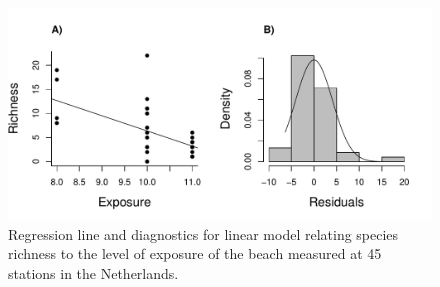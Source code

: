 \documentclass[fleqn,10pt]{wlpeerj} %
\begin{document}

\begin{figure}
\includegraphics[width=1\linewidth]{Figure6} \caption{Regression line and diagnostics for linear model relating species richness to the level of exposure of the beach measured at 45 stations in the Netherlands.}\label{fig:figure6}
\end{figure}


\end{document}
